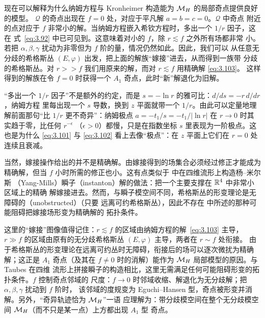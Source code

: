 现在可以解释为什么纳姆方程与 Kronheimer 构造能为 ${{\mathcal{M}}_H}$ 的局部奇点提供良好的模型。
${\mathcal Q}$ 的奇点出现在 $f=0$ 处，对应于平凡解 $a=b=c=0$。${\mathcal Q}$ 中奇点
附近的点对应于 $f$ 非常小的解。当纳姆方程嵌入希钦方程时，多出一个 $1/r$ 因子，这在
式~\eqref{eq:3.92} 中已可见到。这意味着对小的 $f$，除 $r\lesssim f$ 之外所有场都非常
小。若把 $\alpha,\beta,\gamma$ 扰动为非零但为 $f$ 阶的量，情况仍然如此。因此，我们可以
从任意无分歧的希格斯丛 $(E,\varphi)$ 出发，把上面的解族“嫁接”进去，从而得到一族带
分歧的希格斯丛。对 $r>>f$ 我们用原来的解，而对 $r\lesssim f$ 用精确解 \eqref{eq:3.103}。
这样得到的解族在令 $f=0$ 时获得一个 $A_1$ 奇点，此时“新”解退化为旧解。

\begin{yizhu}[易错点]
“多出一个 $1/r$ 因子”不是额外的约定，而是 $s=-\ln r$ 的雅可比：$d/ds=-r\,d/dr$，纳姆方程
里每出现一个 $s$ 导数，换到 $z$ 平面就带一个 $1/r$。由此可以定量地理解前面那句“比 $1/r$
更不奇异”：纳姆极点 $a=-t_1/s=-t_1/|\ln r|$ 在 $r\to 0$ 时其实趋于零，比任何 $r^{-\epsilon}$
（$\epsilon>0$）都慢，只是在指数坐标 $s$ 里表现为一阶极点。这也是为什么 \eqref{eq:3.101} 与
\eqref{eq:3.102} 看上去像“极点”：在 $z$ 平面上它们在 $r=0$ 处连续且衰减。
\end{yizhu}

当然，嫁接操作给出的并不是精确解。由嫁接得到的场集合必须经过修正才能成为精确解，但当
$f$ 小时所需的修正也小。这有点类似于 \cite{ref66} 中在四维流形上构造杨–米尔斯
（Yang-Mills）瞬子（instanton）解的做法：把一个主要支撑在 ${\mathbb{R}}^4$ 中非常小区域上的精确
解嫁接进去。然而，与瞬子模空间不同，希格斯丛的形变理论是无障碍的（unobstructed）（只要
远离可约希格斯丛），因此不存在 \cite{ref66} 中所述的那种可能阻碍把嫁接场形变为精确解的
拓扑条件。

\begin{yizhu}[物理图像补充]
这里的“嫁接”图像值得记住：$r\lesssim f$ 的区域由纳姆方程的解~\eqref{eq:3.103} 主导，
$r\gg f$ 的区域由原有的无分歧希格斯丛 $(E,\varphi)$ 主导，两者在 $r\sim f$ 处衔接。
由于希格斯丛的形变理论在远离可约丛时无障碍，衔接后的场可以逐次微扰为精确解；这正是
$A_1$ 奇点（及其在 $f\neq 0$ 时的消解）能作为 ${{\mathcal{M}}_H}$ 局部模型的原因。与 Taubes 在四维
流形上拼接瞬子的构造相比，这里无需满足任何可能阻碍形变的拓扑条件。$f$ 控制奇点邻域的
尺度：$f\to 0$ 时邻域收缩、解退化为无分歧解；把 $\alpha,\beta,\gamma$ 扰动到 $f$ 阶时，
该邻域的度规变为 Eguchi--Hansen 型，奇点被形变并消解。另外，“奇异轨迹恰为 ${{\mathcal{M}}_H}$”一语
应理解为：带分歧模空间在整个无分歧模空间 ${{\mathcal{M}}_H}$（而不只是某一点）上方都出现 $A_1$ 型
奇点。
\end{yizhu}

